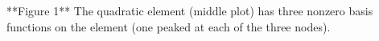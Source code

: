 \documentclass[a4paper,10pt]{article}
\begin{document}
**Figure 1** The quadratic element (middle plot) has three nonzero basis functions on the element (one peaked at each of the three nodes).
\end{document}

